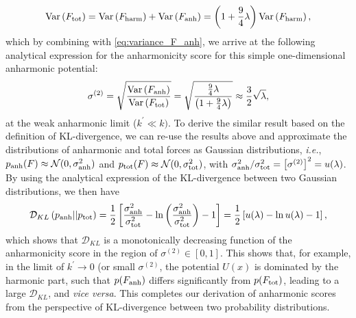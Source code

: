 \begin{equation}
    \label{eq:variance_F_total}
\mbox{Var}\left(F_{\mbox{\scriptsize{tot}}}\right)=\mbox{Var}\left(F_{\mbox{\scriptsize{harm}}}\right)+\mbox{Var}\left(F_{\mbox{\scriptsize{anh}}}\right)=\left(1+\frac{9}{4}\lambda\right)\mbox{Var}\left(F_{\mbox{\scriptsize{harm}}}\right),
\end{equation}
which by combining with \cref{eq:variance_F_anh}, we arrive at the following analytical expression for the anharmonicity score for this simple one-dimensional anharmonic potential:
\begin{equation}
    \label{eq:anh_score_1D_from_variance}
    \sigma^{(2)}=\sqrt{\frac{\mbox{Var}\left(F_{\mbox{\scriptsize{anh}}}\right)}{\mbox{Var}\left(F_{\mbox{\scriptsize{tot}}}\right)}} =\sqrt{\frac{\frac{9}{4}\lambda}{\left(1+\frac{9}{4}\lambda\right)}}\approx\frac{3}{2}\sqrt{\lambda},
\end{equation}
at the weak anharmonic limit ($k^\prime\ll k)$. To derive the similar result based on the definition of KL-divergence, we can re-use the results above and approximate the distributions of anharmonic and total forces as Gaussian distributions, \emph{i.e.}, $p_{\mbox{\scriptsize{anh}}}(F)\approx\mathcal{N}(0,\sigma_{\mbox{\scriptsize{anh}}}^2)$ and $p_{\mbox{\scriptsize{tot}}}(F)\approx\mathcal{N}(0,\sigma_{\mbox{\scriptsize{tot}}}^2)$, with $\sigma_{\mbox{\scriptsize{anh}}}^2/\sigma_{\mbox{\scriptsize{tot}}}^2=\left[\sigma^{(2)}\right]^2=u(\lambda)$. By using the analytical expression of the KL-divergence between two Gaussian distributions, we then have
\begin{equation}
    \label{eq:KL_div_anh_tot}
    \mathcal{D}_{KL}\left(p_{\mbox{\scriptsize{anh}}}||p_{\mbox{\scriptsize{tot}}}\right)=\frac{1}{2}\left[\frac{\sigma_{\mbox{\scriptsize{anh}}}^2}{\sigma_{\mbox{\scriptsize{tot}}}^2}-\ln\left(\frac{\sigma_{\mbox{\scriptsize{anh}}}^2}{\sigma_{\mbox{\scriptsize{tot}}}^2}\right)-1\right]
    =\frac{1}{2}\left[u(\lambda) -\ln u(\lambda)-1\right],
\end{equation}
which shows that $\mathcal{D}_{KL}$ is a monotonically decreasing function of the anharmonicity score in the region of $\sigma^{(2)}\in[0,1]$. This shows that, for example, in the limit of $k^\prime\to0$ (or small $\sigma^{(2)}$, the potential $U(x)$ is dominated by the harmonic part, such that $p(F_{\mbox{\scriptsize{anh}}})$ differs significantly from $p(F_{\mbox{\scriptsize{tot}}})$, leading to a large  $\mathcal{D}_{KL}$, and \emph{vice versa}. This completes our derivation of anharmonic scores from the perspective of KL-divergence between two probability distributions. 